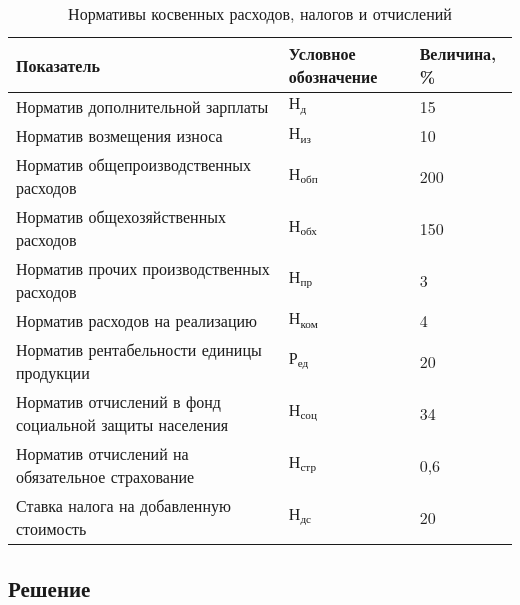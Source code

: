 \begin{table}[h!]
  \caption{Нормативы косвенных расходов, налогов и отчислений}
  \label{tbl:indirect_costs}
  \centering
  \small{
    \begin{tabular}{| p{} | p{} | p{} |}
      \hline
      Показатель & Условное \newline обозначение & Величина, \% \\ \hline

      Норматив дополнительной зарплаты &
      $ \text{Н}_{\text{д}} $ & 15 \\ \hline

      Норматив возмещения износа &
      $ \text{Н}_{\text{из}} $ & 10 \\ \hline

      Норматив общепроизводственных расходов &
      $ \text{Н}_{\text{обп}} $ & 200 \\ \hline

      Норматив общехозяйственных расходов &
      $ \text{Н}_{\text{обх}} $ & 150 \\ \hline

      Норматив прочих производственных расходов &
      $ \text{Н}_{\text{пр}} $ & 3 \\ \hline

      Норматив расходов на реализацию &
      $ \text{Н}_{\text{ком}} $ & 4 \\ \hline

      Норматив рентабельности единицы продукции &
      $ \text{Р}_{\text{ед}} $ & 20 \\ \hline

      Норматив отчислений в фонд социальной защиты населения &
      $ \text{Н}_{\text{соц}} $ & 34 \\ \hline

      Норматив отчислений на обязательное страхование &
      $ \text{Н}_{\text{стр}} $ & 0,6 \\ \hline

      Ставка налога на добавленную стоимость &
      $ \text{Н}_{\text{дс}} $ & 20 \\ \hline

    \end{tabular}
  }
\end{table}


\subsection{Решение}


